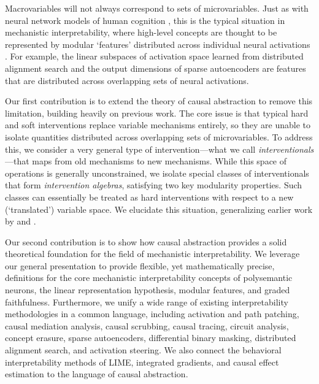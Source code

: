 \documentclass[twoside,11pt]{article}
\begin{document}
Macrovariables will not always correspond to sets of microvariables. Just as with neural network models of human cognition \citep{Smolensky1988a}, this is the typical situation in mechanistic interpretability, where high-level concepts are thought to be represented by modular `features' distributed across individual neural activations \citep{Harradon:2018,olah2020zoom, huang2024ravel}. For example, the linear subspaces of activation space learned from distributed alignment search \citep{Geiger-etal:2023:DAS} and the output dimensions of sparse autoencoders \citep{bricken2023monosemanticity, Cunningham:2023} are features that are distributed across overlapping sets of neural activations. 

Our first contribution is to extend the theory of causal abstraction to remove this limitation, building heavily on previous work. The core issue is that typical hard and soft interventions replace variable mechanisms entirely, so they are unable to isolate quantities distributed across overlapping sets of microvariables. To address this, we consider a very general type of intervention---what we call \textit{interventionals}---that maps from old mechanisms to new mechanisms. While this space of operations is generally unconstrained, we isolate special classes of interventionals that form \textit{intervention algebras}, satisfying two key modularity properties. Such classes can essentially be treated as hard interventions with respect to a new (`translated') variable space. We elucidate this situation, generalizing earlier work by \cite{Rubinstein2017} and \cite{BackersHalpern2019}.


Our second contribution is to show how causal abstraction provides a solid theoretical foundation for the field of mechanistic interpretability. We leverage our general presentation to provide flexible, yet mathematically precise, definitions for the core mechanistic interpretability concepts of polysemantic neurons, the linear representation hypothesis, modular features, and graded faithfulness. Furthermore, we unify a wide range of existing interpretability methodologies in a common language, including activation and path patching, causal mediation analysis, causal scrubbing, causal tracing, circuit analysis, concept erasure, sparse autoencoders, differential binary masking, distributed alignment search, and activation steering. We also connect the behavioral interpretability methods of LIME, integrated gradients, and causal effect estimation to the language of causal abstraction.
\end{document}
